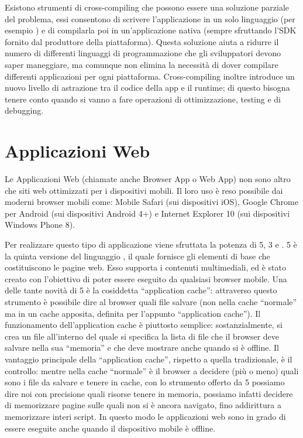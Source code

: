         Esistono strumenti di cross-com\-pil\-ing che possono essere una soluzione
        parziale del problema, essi consentono di scrivere l'applicazione in un solo
        linguaggio (per esempio \js{}) e di compilarla poi in un'applicazione
        nativa (sempre sfruttando l'SDK fornito dal produttore della
        piattaforma). Questa soluzione aiuta a ridurre il numero di differenti
        linguaggi di programmazione che gli sviluppatori devono saper maneggiare,
        ma comunque non elimina la necessità di dover compilare differenti
        applicazioni per ogni piattaforma. Cross-com\-pil\-ing inoltre introduce un
        nuovo livello di astrazione tra il codice della app e il run\-time; di
        questo bisogna tenere conto quando si vanno a fare operazioni di
        ottimizzazione, test\-ing e di de\-bug\-ging.

    \section{Applicazioni Web}
    \label{sec:webapp}
        Le Applicazioni Web (chiamate anche \mbox{Browser} App o Web App) non sono
        altro che siti web ottimizzati per i dispositivi mobili. Il loro uso è
        reso possibile dai moderni \mbox{browser} mobili come: Mobile Safari (sui
        dispositivi iOS), Google Chrome per Android (sui dispositivi Android 4+)
        e Internet Explorer 10 (sui dispositivi Windows Phone 8).\clearpage

        Per realizzare questo tipo di applicazione viene sfruttata la potenza di
        \html{}5, \css{}3 e \js{}. \html{}5 è la quinta versione del linguaggio
        \html{}, il quale fornisce gli elementi di base che costituiscono le pagine
        web. Esso supporta i contenuti multimediali, ed è stato creato con
        l'obiettivo di poter essere eseguito da qualsiasi \mbox{browser}
        mobile\citep{White:Native-vs-Html}. Una delle tante novità di \html{}5 è la
        cosiddetta ``ap\-pli\-ca\-tion \mbox{cache}'': attraverso questo strumento è
        possibile dire al \mbox{browser} quali file salvare (non nella \mbox{cache}
        ``normale'' ma in un \mbox{cache} apposita, definita per l'appunto
        ``ap\-pli\-ca\-tion \mbox{cache}''). Il funzionamento dell'ap\-pli\-ca\-tion \mbox{cache} è
        piuttosto semplice: sostanzialmente, si crea un file all'interno del
        quale si specifica la lista di file che il \mbox{browser} deve salvare nella
        sua ``memoria'' e che deve mostrare anche quando si è offline. Il
        vantaggio principale della ``ap\-pli\-ca\-tion \mbox{cache}'', rispetto a quella
        tradizionale, è il controllo: mentre nella \mbox{cache} ``normale'' è il
        \mbox{browser} a decidere (più o meno) quali sono i file da salvare e tenere in
        \mbox{cache}, con lo strumento offerto da \html{}5 possiamo dire noi con
        precisione quali risorse tenere in memoria, possiamo infatti decidere di
        memorizzare pagine sulle quali non si è ancora navigato, fino
        addirittura a memorizzare interi script. In questo modo le applicazioni
        web sono in grado di essere eseguite anche quando il dispositivo mobile
        è offline.

